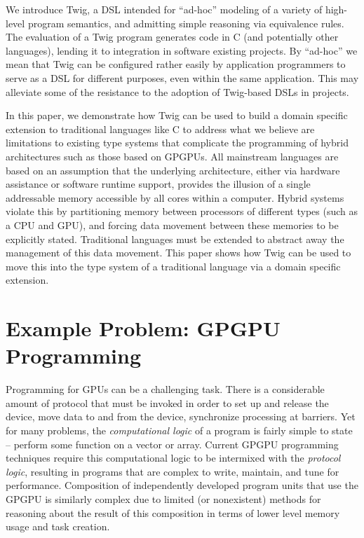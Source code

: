 \documentclass[11pt]{article}
\begin{document}
We introduce Twig, a DSL intended for ``ad-hoc'' modeling of a variety of
high-level program semantics, and admitting simple reasoning via equivalence
rules. The evaluation of a Twig program generates code in C (and potentially
other languages), lending it to integration in software existing projects. By
``ad-hoc'' we mean that Twig can be configured rather easily by application
programmers to serve as a DSL for different purposes, even within the same
application. This may alleviate some of the resistance to the adoption of
Twig-based DSLs in projects.

In this paper, we demonstrate how Twig can be used to build a domain specific
extension to traditional languages like C to address what we believe are
limitations to existing type systems that complicate the programming of hybrid
architectures such as those based on GPGPUs. All mainstream languages are
based on an assumption that the underlying architecture, either via hardware
assistance or software runtime support, provides the illusion of a single
addressable memory accessible by all cores within a computer. Hybrid systems
violate this by partitioning memory between processors of different types
(such as a CPU and GPU), and forcing data movement between these memories to
be explicitly stated. Traditional languages must be extended to abstract away
the management of this data movement. This paper shows how Twig can be used to
move this into the type system of a traditional language via a domain specific
extension. %

\section{Example Problem: GPGPU Programming}

Programming for GPUs can be a challenging task. There is a considerable amount
of protocol that must be invoked in order to set up and release the device,
move data to and from the device, synchronize processing at barriers. Yet for
many problems, the \emph{computational logic} of a program is fairly simple to
state -- perform some function on a vector or array. Current GPGPU programming
techniques require this computational logic to be intermixed with the
\emph{protocol logic}, resulting in programs that are complex to write,
maintain, and tune for performance. Composition of independently developed
program units that use the GPGPU is similarly complex due to limited (or
nonexistent) methods for reasoning about the result of this composition in
terms of lower level memory usage and task creation.
\end{document}
